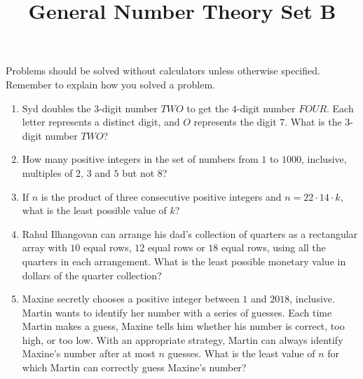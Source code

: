\documentclass{article}
\title{General Number Theory Set B}
\date{}
\author{}
\begin{document}
\maketitle
\begin{multicols}{2}
    \noindent Problems should be solved without calculators unless otherwise specified.
    Remember to explain how you solved a problem.
    \begin{enumerate}
        \item Syd doubles the $3$-digit number $TWO$ to get the $4$-digit number $FOUR$.
        Each letter represents a distinct digit, and $O$ represents the digit $7$.
        What is the $3$-digit number $TWO$?
            \vspace{3cm}
        \item How many positive integers in the set of numbers from $1$ to $1000$, inclusive, multiples of $2$, $3$ and $5$ but not $8$?
            \vspace{3cm}
        \item If $n$ is the product of three consecutive positive integers and $n = 22 \cdot 14 \cdot k$,
        what is the least possible value of $k$?
            \vspace{3cm}
        \item Rahul Ilhangovan can arrange his dad's collection of quarters as a rectangular array with $10$ equal rows,
        $12$ equal rows or $18$ equal rows, using all the quarters in each arrangement.
        What is the least possible monetary value in dollars of the quarter collection?
            \vspace{3cm}
        \item Maxine secretly chooses a positive integer between $1$ and $2018$, inclusive.
        Martin wants to identify her number with a series of guesses.
        Each time Martin makes a guess, Maxine tells him whether his number is correct, too high, or too low.
        With an appropriate strategy, Martin can always identify Maxine's number after at most $n$ guesses.
        What is the least value of $n$ for which Martin can correctly guess Maxine's number?
            \vspace{3cm}
    \end{enumerate}
\end{multicols}
\end{document}
